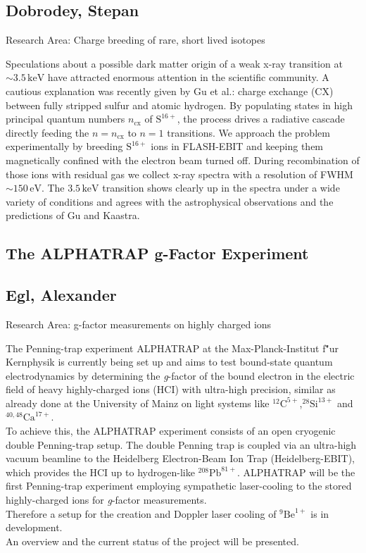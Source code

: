 \subsection*{\centering \normalsize Dobrodey, Stepan}
Research Area: Charge breeding of rare, short lived isotopes\newline

\noindent Speculations about a possible dark matter origin of a weak x-ray transition at $\sim 3.5\,\mathrm{keV}$ have attracted enormous attention in the scientific community. A cautious explanation was recently given by Gu et al.: charge exchange (CX) between fully stripped sulfur and atomic hydrogen.
By populating states in high principal quantum numbers $n_{\mathrm{cx}}$ of $\mathrm{S}^{16+}$, the process drives a radiative cascade directly feeding the $n = n_{\mathrm{cx}}$ to $n = 1$ transitions. We approach the problem experimentally by breeding $\mathrm{S}^{16+}$ ions in FLASH-EBIT and keeping them magnetically confined with the electron beam turned off. During recombination of those ions with residual gas we collect x-ray spectra with a resolution of FWHM $\sim 150\,\mathrm{eV}$. The $3.5\,\mathrm{keV}$ transition shows clearly up in the spectra under a wide variety of conditions and agrees with the astrophysical observations and the predictions of Gu and Kaastra.

\subsection*{\centering \large The ALPHATRAP g-Factor Experiment}
\subsection*{\centering \normalsize Egl, Alexander}
Research Area: g-factor measurements on highly charged ions\newline

\noindent The Penning-trap experiment ALPHATRAP at the Max-Planck-Institut f\""ur Kernphysik is currently being set up and aims to test bound-state quantum electrodynamics by determining the \textit{g}-factor of the bound electron in the electric field of heavy highly-charged ions (HCI) with ultra-high precision, similar as already done at the University of Mainz on light systems like $^{12}\textrm{C}^{5+}$,$^{28}\textrm{Si}^{13+}$ and $^{40,48}\textrm{Ca}^{17+}$. \\To achieve this, the ALPHATRAP experiment consists of an open cryogenic double Penning-trap setup. The double Penning trap is coupled via an ultra-high vacuum beamline to the Heidelberg Electron-Beam Ion Trap (Heidelberg-EBIT), which provides the HCI up to hydrogen-like $^{208}\textrm{Pb}^{81+}$. ALPHATRAP will be the first Penning-trap experiment employing sympathetic laser-cooling to the stored highly-charged ions for \textit{g}-factor measurements.\\Therefore a setup for the creation and Doppler laser cooling of $^{9}\textrm{Be}^{1+}$ is in development.\\An overview and the current status of the project will be presented.


